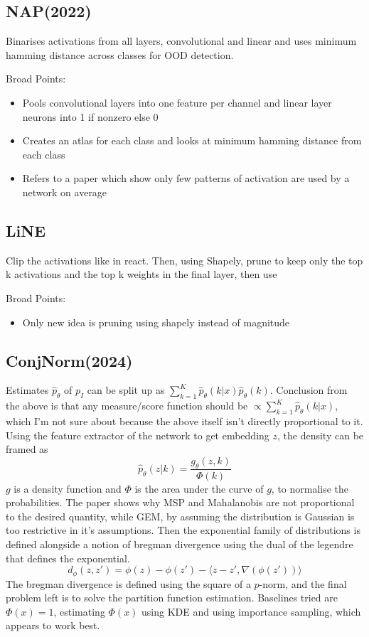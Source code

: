 \documentclass{article}
\providecommand{\inner}[1]{\langle#1\rangle}
\begin{document}
        \subsection{NAP(2022)}
            Binarises activations from all layers, convolutional and linear and uses minimum hamming distance across classes for OOD detection.
            
            Broad Points:
            \begin{itemize}
                \item 
                    Pools convolutional layers into one feature per channel and linear layer neurons into 1 if nonzero else 0 
                \item 
                    Creates an atlas for each class and looks at minimum hamming distance from each class
                \item 
                    Refers to a paper which show only few patterns of activation are used by a network on average 
            \end{itemize}
        \subsection{LiNE}
            Clip the activations like in react. Then, using Shapely, prune to keep only the top k activations and the top k weights in the final layer, then use 
            
            Broad Points:
            \begin{itemize}
                \item 
                    Only new idea is pruning using shapely instead of magnitude
            \end{itemize}
        \subsection{ConjNorm(2024)}
            Estimates $\hat{p}_\theta$ of $p_I$ can be split up as $\sum_{k=1}^K \hat{p}_{\theta}(k|x)\hat{p}_{\theta}(k)$. Conclusion from the above is that any measure/score function should be $\propto \sum_{k=1}^K \hat{p}_{\theta}(k|x)$, which I'm not sure about because the above itself isn't directly proportional to it. Using the feature extractor of the network to get embedding $z$, the density can be framed as 
            \[\hat{p}_\theta(z|k) = \frac{g_\theta(z, k)}{\Phi(k)}\]
            $g$ is a density function and $\Phi$ is the area under the curve of $g$, to normalise the probabilities. The paper shows why MSP and Mahalanobis are not proportional to the desired quantity, while GEM, by assuming the distribution is Gaussian is too restrictive in it's assumptions. Then the exponential family of distributions is defined alongside a notion of bregman divergence using the dual of the legendre that defines the exponential.
            \[d_{\phi}(z, z') = \phi(z) - \phi(z') - \inner{z - z', \nabla(\phi(z'))}\]
            The bregman divergence is defined using the square of a $p$-norm, and the final problem left is to solve the partition function estimation. Baselines tried are $\Phi(x) = 1$, estimating $\Phi(x)$ using KDE and using importance sampling, which appears to work best. \\
            
\end{document}
